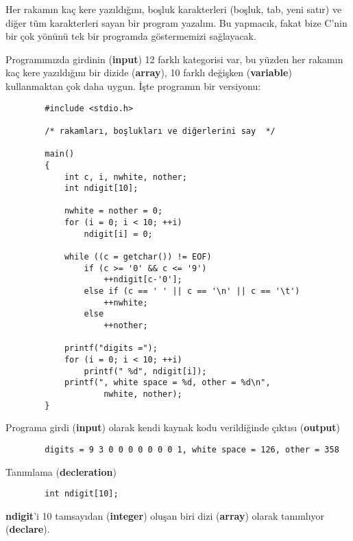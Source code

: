 \documentclass[a4paper,12pt,oneside]{book}
\begin{document}
Her rakamın kaç kere yazıldığını, boşluk karakterleri (boşluk, tab, yeni satır) ve diğer tüm karakterleri sayan bir program yazalım. Bu yapmacık, fakat bize C'nin bir çok yönünü tek bir programda göstermemizi sağlayacak.
\par Programımızda girdinin (\textbf{input}) 12 farklı kategorisi var, bu yüzden her rakamın kaç kere yazıldığını bir dizide (\textbf{array}), 10 farklı değişken (\textbf{variable}) kullanmaktan çok daha uygun. İşte programın bir versiyonu:
\begin{lstlisting}
		#include <stdio.h>

		/* rakamları, boşlukları ve diğerlerini say  */

		main()
		{
			int c, i, nwhite, nother;
			int ndigit[10];

			nwhite = nother = 0;
			for (i = 0; i < 10; ++i)
				ndigit[i] = 0;

			while ((c = getchar()) != EOF)
				if (c >= '0' && c <= '9')
					++ndigit[c-'0'];
				else if (c == ' ' || c == '\n' || c == '\t')
					++nwhite;
				else
					++nother;

			printf("digits =");
			for (i = 0; i < 10; ++i)
				printf(" %d", ndigit[i]);
			printf(", white space = %d, other = %d\n",
					nwhite, nother);
		}
\end{lstlisting}
Programa girdi (\textbf{input}) olarak kendi kaynak kodu verildiğinde çıktısı (\textbf{output})
\begin{lstlisting}
		digits = 9 3 0 0 0 0 0 0 0 1, white space = 126, other = 358
\end{lstlisting}
Tanımlama (\textbf{decleration})
\begin{lstlisting}
		int ndigit[10];
\end{lstlisting}
\textbf{ndigit}'i 10 tamsayıdan (\textbf{integer}) oluşan biri dizi (\textbf{array}) olarak tanımlıyor (\textbf{declare}). \pagebreak
\end{document}
